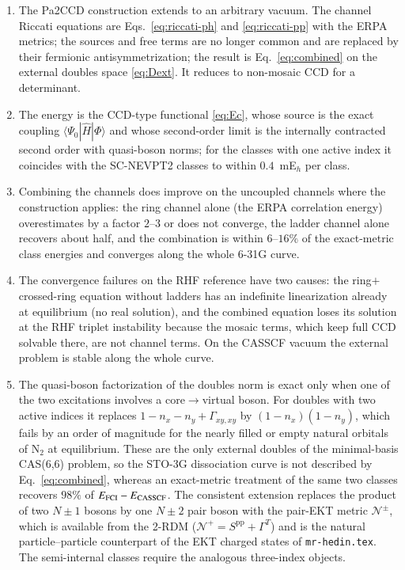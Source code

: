 \documentclass[aip,jcp,reprint,noshowkeys,superscriptaddress]{revtex4-1}
\newcommand{\pp}{\text{pp}}
\begin{document}
\begin{enumerate}
\item The Pa2CCD construction extends to an arbitrary vacuum.  The channel
  Riccati equations are Eqs.~\eqref{eq:riccati-ph} and \eqref{eq:riccati-pp}
  with the ERPA metrics; the sources and free terms are no longer common and
  are replaced by their fermionic antisymmetrization; the result is
  Eq.~\eqref{eq:combined} on the external doubles space \eqref{eq:Dext}.  It
  reduces to non-mosaic CCD for a determinant.
\item The energy is the CCD-type functional \eqref{eq:Ec}, whose source is
  the exact coupling $\langle\Psi_0|\hat H|\Phi\rangle$ and whose second-order
  limit is the internally contracted second order with quasi-boson norms;
  for the classes with one active index it coincides with the SC-NEVPT2
  classes to within $0.4$~mE$_h$ per class.
\item Combining the channels does improve on the uncoupled channels where
  the construction applies: the ring channel alone (the ERPA correlation
  energy) overestimates by a factor $2$--$3$ or does not converge, the
  ladder channel alone recovers about half, and the combination is within
  $6$--$16\%$ of the exact-metric class energies and converges along the
  whole 6-31G curve.
\item The convergence failures on the RHF reference have two causes: the
  ring$+$crossed-ring equation without ladders has an indefinite linearization
  already at equilibrium (no real solution), and the combined equation loses
  its solution at the RHF triplet instability because the mosaic terms, which
  keep full CCD solvable there, are not channel terms.  On the CASSCF vacuum
  the external problem is stable along the whole curve.
\item The quasi-boson factorization of the doubles norm is exact only when
  one of the two excitations involves a core$\to$virtual boson.  For doubles
  with two active indices it replaces $1-n_x-n_y+\Gamma_{xy,xy}$ by
  $(1-n_x)(1-n_y)$, which fails by an order of magnitude for the nearly
  filled or empty natural orbitals of N$_2$ at equilibrium.  These are the
  only external doubles of the minimal-basis CAS(6,6) problem, so the STO-3G
  dissociation curve is not described by Eq.~\eqref{eq:combined}, whereas an
  exact-metric treatment of the same two classes recovers $98\%$ of
  $E_{\rm FCI}-E_{\rm CASSCF}$.  The consistent extension replaces the
  product of two $N{\pm}1$ bosons by one $N{\pm}2$ pair boson with the
  pair-EKT metric $\mathcal N^{\pm}$, which is available from the 2-RDM
  ($\mathcal N^{+}=S^{\pp}+\Gamma^{T}$) and is the natural particle--particle
  counterpart of the EKT charged states of \texttt{mr-hedin.tex}.  The
  semi-internal classes require the analogous three-index objects.
\end{enumerate}


\end{document}
